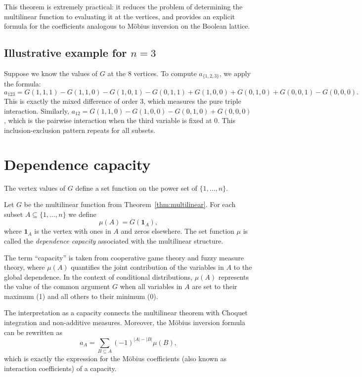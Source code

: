 This theorem is extremely practical: it reduces the problem of determining the multilinear function to evaluating it at the vertices, and provides an explicit formula for the coefficients analogous to Möbius inversion on the Boolean lattice.

\subsection{Illustrative example for \(n=3\)}

Suppose we know the values of \(G\) at the 8 vertices. To compute \(a_{\{1,2,3\}}\), we apply the formula:
\[
a_{123} = G(1,1,1) - G(1,1,0) - G(1,0,1) - G(0,1,1) + G(1,0,0) + G(0,1,0) + G(0,0,1) - G(0,0,0).
\]
This is exactly the mixed difference of order 3, which measures the pure triple interaction. Similarly, \(a_{12} = G(1,1,0) - G(1,0,0) - G(0,1,0) + G(0,0,0)\), which is the pairwise interaction when the third variable is fixed at 0. This inclusion-exclusion pattern repeats for all subsets.

\section{Dependence capacity}
\label{sec:dependence-capacity}

The vertex values of \(G\) define a set function on the power set of \(\{1,\ldots,n\}\).

\begin{definition}
Let \(G\) be the multilinear function from Theorem~\ref{thm:multilinear}. For each subset \(A\subseteq\{1,\ldots,n\}\) we define
\[
\mu(A) = G(\mathbf{1}_A),
\]
where \(\mathbf{1}_A\) is the vertex with ones in \(A\) and zeros elsewhere. The set function \(\mu\) is called the \emph{dependence capacity} associated with the multilinear structure.
\end{definition}

The term “capacity” is taken from cooperative game theory and fuzzy measure theory, where \(\mu(A)\) quantifies the joint contribution of the variables in \(A\) to the global dependence. In the context of conditional distributions, \(\mu(A)\) represents the value of the common argument \(G\) when all variables in \(A\) are set to their maximum (1) and all others to their minimum (0).

The interpretation as a capacity connects the multilinear theorem with Choquet integration and non-additive measures. Moreover, the Möbius inversion formula can be rewritten as
\[
a_A = \sum_{B\subseteq A} (-1)^{|A|-|B|} \mu(B),
\]
which is exactly the expression for the Möbius coefficients (also known as interaction coefficients) of a capacity.


